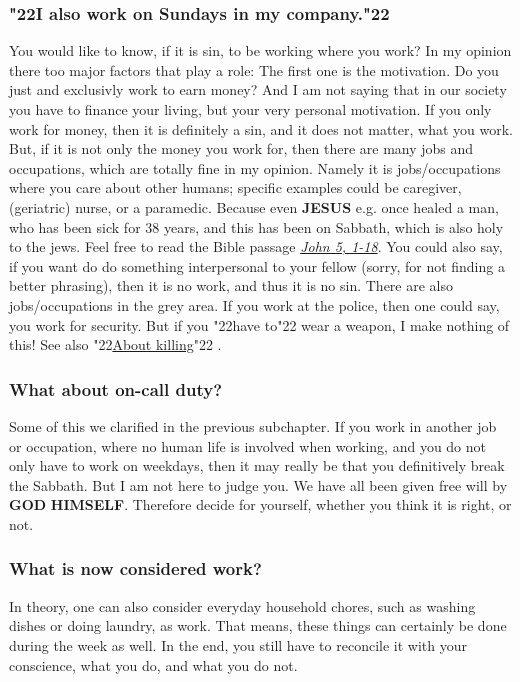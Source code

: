 \documentclass[12pt,a5paper]{article}
\newcommand{\God}[0]{\textbf{GOD}}
\newcommand{\Himself}[0]{\textbf{HIMSELF}}
\newcommand{\Jesus}[0]{\textbf{JESUS}}
\newcommand{\q}[1]{\char"22{#1}\char"22 }
\begin{document}
	\subsubsection{\q{I also work on Sundays in my company.}}
		You would like to know,
		if it is sin,
		to be working where you work?
		In my opinion there too major factors that play a role:
		The first one is the motivation.
		Do you just and exclusivly work to earn money?
		And I am not saying that in our society you have to finance your living,
		but your very personal motivation.
		If you only work for money,
		then it is definitely a sin,
		and it does not matter,
		what you work.
		But,
		if it is not only the money you work for,
		then there are many jobs and occupations,
		which are totally fine in my opinion.
		Namely it is jobs/occupations where you care about other humans;
		specific examples could be
		caregiver,
		(geriatric) nurse,
		or a paramedic.
		Because even {\Jesus} e.g. once healed a man,
		who has been sick for 38 years,
		and this has been on Sabbath,
		which is also holy to the jews.
		Feel free to read the Bible passage \textit{\href{https://www.die-bibel.de/bibeln/online-bibeln/lesen/ESV/JHN.5/John-5}{John 5, 1-18}}.
		You could also say,
		if you want do do something interpersonal to your fellow
		(sorry,
		for not finding a better phrasing),
		then it is no work,
		and thus it is no sin.
		There are also jobs/occupations in the grey area.
		If you work at the police,
		then one could say,
		you work for security.
		But if you \q{have to} wear a weapon,
		I make nothing of this!
		See also \q{\hyperref[VomToeten]{About killing}}.

	\subsubsection{What about on-call duty?}
		Some of this we clarified in the previous subchapter.
		If you work in another job or occupation,
		where no human life is involved when working,
		and you do not only have to work on weekdays,
		then it may really be that you definitively break the Sabbath.
		But I am not here to judge you.
		We have all been given free will by {\God} {\Himself}.
		Therefore decide for yourself,
		whether you think it is right,
		or not.
		
	\subsubsection{What is now considered work?}
		In theory,
		one can also consider everyday household chores,
		such as washing dishes or doing laundry,
		as work.
		That means,
		these things can certainly be done during the week as well.
		In the end,
		you still have to reconcile it with your conscience,
		what you do,
		and what you do not.
\end{document}
